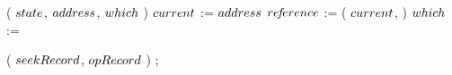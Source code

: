 \begin{limitscope}
\begin{algorithm}[tbh]
{{{			   
				 \AddToTop( $state$, $address$, $which$ )\;
				 \label{lin:local-seek|successor:while:traversal:stack}
				 \label{lin:local-seek|successor:while:traversal:advance:begin}
			   $current$ := $address$\;
			   $re\!f\!erence$ := \GetChild( $current$, \LEFT{} )\;
			   $which$ := \LEFT{}\;
				 \label{lin:local-seek|successor:while:traversal:advance:end}
				 \label{lin:local-seek|successor:while:traversal:end}
			}
			\label{lin:local-seek|successor:while:end}
	 }
	
	 \PopulateSeekRecord( $seekRecord$, $opRecord$ )\;
	 \Return \True;
	 \label{lin:local-seek|successor:end}
}
\end{algorithm}
\end{limitscope}